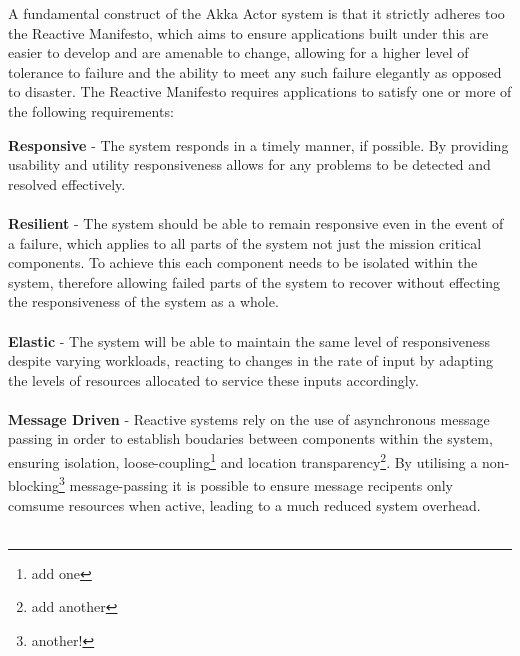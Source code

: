 \documentclass[a4paper, 11pt]{article}
\begin{document}
A fundamental construct of the Akka Actor system is that it strictly adheres too the Reactive Manifesto, which aims to ensure applications built under this are easier to develop and are amenable to change, allowing for a higher level of tolerance to failure and the ability to meet any such failure elegantly as opposed to disaster\cite{reactMan}. The Reactive Manifesto requires applications to satisfy one or more of the following requirements\cite{reactMan}:


\textbf{Responsive} - The system responds in a timely manner, if possible. By providing usability and utility responsiveness allows for any problems to be detected and resolved effectively.\\\\
\textbf{Resilient} - The system should be able to remain responsive even in the event of a failure, which applies to all parts of the system not just the mission critical components. To achieve this each component needs to be isolated within the system, therefore allowing failed parts of the system to recover without effecting the responsiveness of the system as a whole.\\\\
\textbf{Elastic} - The system will be able to maintain the same level of responsiveness despite varying workloads, reacting to changes in the rate of input by adapting the levels of resources allocated to service these inputs accordingly.\\\\
\textbf{Message Driven} - Reactive systems rely on the use of asynchronous message passing in order to establish boudaries between components within the system, ensuring isolation, loose-coupling\footnote{add one} and location transparency\footnote{add another}. By utilising a non-blocking\footnote{another!} message-passing it is possible to ensure message recipents only comsume resources when active, leading to a much reduced system overhead.\\\\
\end{document}
